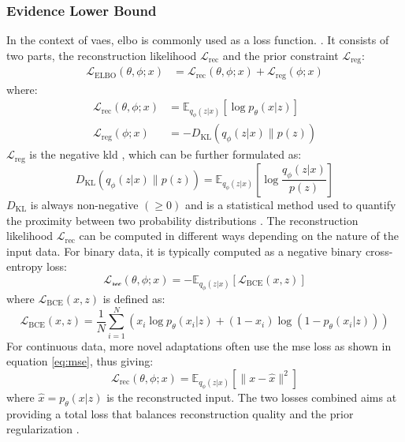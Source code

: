 \subsubsection{Evidence Lower Bound}
\label{back:elbo}
In the context of \acrshort{vae}s, \acrshort{elbo} is commonly used as a loss function. \cite{lygerakis2024edvaeentropydecompositionelbo}. It consists of two parts, the reconstruction likelihood $\mathcal{L}_{\text{rec}}$ and the prior constraint $\mathcal{L}_{\text{reg}}$:
\begin{align}
\mathcal{L}_{\text{ELBO}}(\theta, \phi; x) &= \mathcal{L}_{\text{rec}}(\theta, \phi; x) + \mathcal{L}_{\text{reg}}(\phi; x)  
\end{align}
where:
\begin{align}
\mathcal{L}_{\text{rec}}(\theta, \phi; x) &= \mathbb{E}_{q_\phi(z|x)}[\log p_\theta(x|z)] \\
\mathcal{L}_{\text{reg}}(\phi; x) &= -D_{\text{KL}}(q_\phi(z|x) \| p(z))
\end{align}
$\mathcal{L}_{\text{reg}}$ is the negative \acrfull{kld} \cite{10.1214/aoms/1177729694}, which can be further formulated as:
\begin{equation}
    D_{\text{KL}}(q_\phi(z|x) \| p(z)) = \mathbb{E}_{q_\phi(z|x)}\left[\log \frac{q_\phi(z|x)}{p(z)}\right]
\end{equation}
$D_{\text{KL}}$ is always non-negative $(\geq 0)$ and is a statistical method used to quantify the proximity between two probability distributions \cite{shlens2014notes}. 
The reconstruction likelihood $\mathcal{L}_{\text{rec}}$ can be computed in different ways depending on the nature of the input data. For binary data, it is typically computed as a negative binary cross-entropy loss:
\begin{equation}
\mathcal{L_\text{rec}}(\theta, \phi; x) = - \mathbb{E}_{q_\phi(z|x)}[\mathcal{L}_{\text{BCE}}(x, z)]
\end{equation}
where $\mathcal{L}_{\text{BCE}}(x, z)$ is defined as:
\begin{equation}
\mathcal{L}_{\text{BCE}}(x, z) = \frac{1}{N} \sum_{i=1}^{N} \left( x_i \log p_\theta(x_i|z) + (1 - x_i) \log(1 - p_\theta(x_i|z)) \right)
\end{equation}
For continuous data, more novel adaptations \cite{lygerakis2024edvaeentropydecompositionelbo} often use the \acrshort{mse} loss as shown in equation \ref{eq:mse}, thus giving:
\begin{equation}
    \mathcal{L}_{\text{rec}}(\theta, \phi; x) = \mathbb{E}_{q_\phi(z|x)}[\|x - \hat{x}\|^2]
\end{equation}
where $\hat{x} = p_\theta(x|z)$ is the reconstructed input.
The two losses combined aims at providing a total loss that balances reconstruction quality and the prior regularization \cite{lin2019balancingreconstructionqualityregularisation}.

